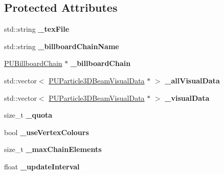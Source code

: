\subsection*{Protected Attributes}
\begin{DoxyCompactItemize}
\item 
\mbox{\label{classPUBeamRender_a50386e675653a9cb95fd35734af18fe1}} 
std\+::string {\bfseries \+\_\+tex\+File}
\item 
\mbox{\label{classPUBeamRender_abc17b3f19351effe4b4726fe521e72ea}} 
std\+::string {\bfseries \+\_\+billboard\+Chain\+Name}
\item 
\mbox{\label{classPUBeamRender_ae65f57700d533092860c600f5a9c8fe0}} 
\hyperlink{classPUBillboardChain}{P\+U\+Billboard\+Chain} $\ast$ {\bfseries \+\_\+billboard\+Chain}
\item 
\mbox{\label{classPUBeamRender_a99bced27db1e09c737ca884c630371b9}} 
std\+::vector$<$ \hyperlink{classPUParticle3DBeamVisualData}{P\+U\+Particle3\+D\+Beam\+Visual\+Data} $\ast$ $>$ {\bfseries \+\_\+all\+Visual\+Data}
\item 
\mbox{\label{classPUBeamRender_acd0e7ee0cca21f2d9427adcbd4c8ad67}} 
std\+::vector$<$ \hyperlink{classPUParticle3DBeamVisualData}{P\+U\+Particle3\+D\+Beam\+Visual\+Data} $\ast$ $>$ {\bfseries \+\_\+visual\+Data}
\item 
\mbox{\label{classPUBeamRender_abe5f065ecc194046c4009c063b84478f}} 
size\+\_\+t {\bfseries \+\_\+quota}
\item 
\mbox{\label{classPUBeamRender_a0ee64c6a88f433fc06c79e929f373f1c}} 
bool {\bfseries \+\_\+use\+Vertex\+Colours}
\item 
\mbox{\label{classPUBeamRender_ab4f6e08dcafa41a2accbdc9fae45ed4b}} 
size\+\_\+t {\bfseries \+\_\+max\+Chain\+Elements}
\item 
\mbox{\label{classPUBeamRender_a783febf4bed22f636a0159fdfd160b96}} 
float {\bfseries \+\_\+update\+Interval}
\item 
\mbox{\label{classPUBeamRender_af606683359b196816083b476e5f8861c}} 

\end{DoxyCompactItemize}

